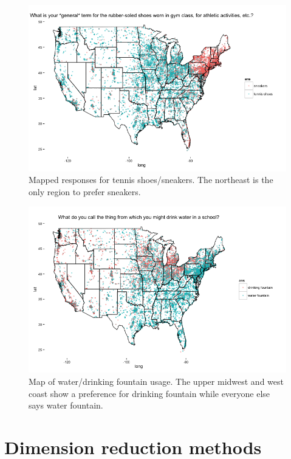 \documentclass[english]{article}\usepackage{graphicx, color}
\numberwithin{equation}{section}
\numberwithin{figure}{section}
\begin{document}
\begin{figure}
\begin{center}
\includegraphics[scale = .5]{Rplot2.png}
\end{center}
\caption{Mapped responses for tennis shoes/sneakers. The northeast is the only region to prefer sneakers.}
\end{figure}

\begin{figure}
\begin{center}
\includegraphics[scale = .5]{Rplot3.png}
\end{center}
\caption{Map of water/drinking fountain usage. The upper midwest and west coast show a preference for drinking fountain while everyone else says water fountain.}
\end{figure}



\section{Dimension reduction methods}
\end{document}
